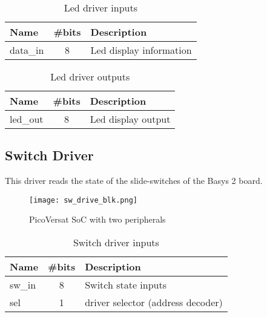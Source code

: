 \begin{table}[!htbp]
    \centering
    \caption{Led driver inputs}
    \label{tab:ledIn}
    \begin{tabular}{@{}lll@{}}
    \toprule
    Name     & \#bits                & Description             \\ \midrule
    data\_in & \multicolumn{1}{c}{8} & Led display information \\ \bottomrule
    \end{tabular}
    \end{table}

\begin{table}[!htbp]
    \centering
    \caption{Led driver outputs}
    \label{tab:ledOut}
    \begin{tabular}{@{}lll@{}}
    \toprule
    Name     & \#bits                & Description        \\ \midrule
    led\_out & \multicolumn{1}{c}{8} & Led display output \\ \bottomrule
    \end{tabular}
    \end{table}



\subsection{Switch Driver}

This driver reads the state of the slide-switches of the Basys 2 board.

\begin{figure}[!htbp]
    \centerline{\texttt{[image: sw\_drive\_blk.png]}}
    \vspace{0cm}\caption{PicoVersat SoC with two peripherals}
    \label{fig:periphs}
\end{figure}

\begin{table}[!htbp]
    \centering
    \caption{Switch driver inputs}
    \label{tab:swIn}
    \begin{tabular}{@{}lcl@{}}
    \toprule
    Name   & \multicolumn{1}{l}{\#bits} & Description                       \\ \midrule
    sw\_in & 8                          & Switch state inputs               \\
    sel    & 1                          & driver selector (address decoder) \\ \bottomrule
    \end{tabular}
    \end{table}

